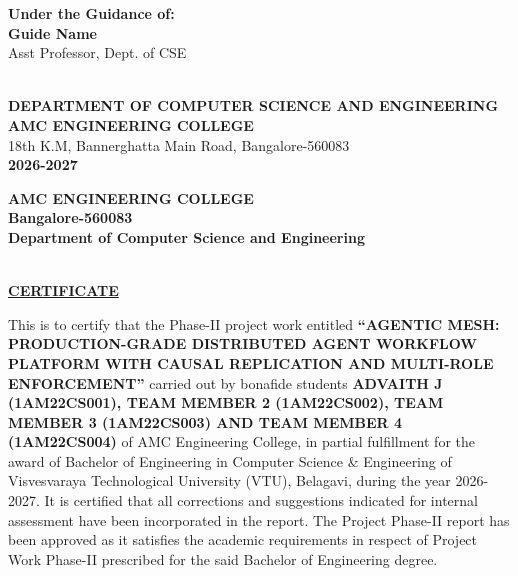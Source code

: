 \documentclass[12pt,a4paper]{report}
\begin{document}
\begin{titlepage}
\begin{center}
    {\small \textbf{Under the Guidance of:}}\\[3pt]
    {\normalsize \textbf{Guide Name}}\\[2pt]
    {\small Asst Professor, Dept. of CSE}\\[14pt]

    \\[8pt]

    {\small \textbf{DEPARTMENT OF COMPUTER SCIENCE AND ENGINEERING}}\\[2pt]
    {\normalsize \textbf{AMC ENGINEERING COLLEGE}}\\[2pt]
    {\small 18th K.M, Bannerghatta Main Road, Bangalore-560083}\\[2pt]
    {\small \textbf{2026-2027}}
\end{center}
\end{titlepage}

\newpage
{}
\setcounter{page}{1}

\begin{center}
    {\large \textbf{AMC ENGINEERING COLLEGE}}\\[2pt]
    {\small \textbf{Bangalore-560083}}\\[4pt]
    {\normalsize \textbf{Department of Computer Science and Engineering}}\\[8pt]

    \\[14pt]

    {\large \textbf{\underline{CERTIFICATE}}}\\[18pt]
\end{center}

\noindent
This is to certify that the Phase-II project work entitled \textbf{“AGENTIC MESH: PRODUCTION-GRADE DISTRIBUTED AGENT WORKFLOW PLATFORM WITH CAUSAL REPLICATION AND MULTI-ROLE ENFORCEMENT”} carried out by bonafide students \textbf{ADVAITH J (1AM22CS001), TEAM MEMBER 2 (1AM22CS002), TEAM MEMBER 3 (1AM22CS003) AND TEAM MEMBER 4 (1AM22CS004)} of AMC Engineering College, in partial fulfillment for the award of Bachelor of Engineering in Computer Science \& Engineering of Visvesvaraya Technological University (VTU), Belagavi, during the year 2026-2027. It is certified that all corrections and suggestions indicated for internal assessment have been incorporated in the report. The Project Phase-II report has been approved as it satisfies the academic requirements in respect of Project Work Phase-II prescribed for the said Bachelor of Engineering degree.\\[45pt]
\end{document}
